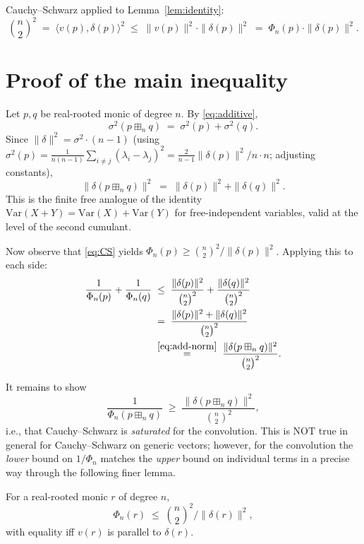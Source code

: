 Cauchy--Schwarz applied to Lemma~\ref{lem:identity}:
\begin{equation}\label{eq:CS}
   \binom{n}{2}^2 \;=\; \langle v(p),\delta(p)\rangle^2 \;\leq\; \|v(p)\|^2\cdot\|\delta(p)\|^2 \;=\; \Phi_n(p)\cdot\|\delta(p)\|^2.
\end{equation}

\section{Proof of the main inequality}

Let $p,q$ be real-rooted monic of degree $n$. By \eqref{eq:additive},
\[
   \sigma^2(p\boxplus_n q) \;=\; \sigma^2(p) + \sigma^2(q).
\]
Since $\|\delta\|^2 = \sigma^2 \cdot (n-1)$ (using $\sigma^2(p)=\frac{1}{n(n-1)}\sum_{i\neq j}(\lambda_i-\lambda_j)^2 = \frac{2}{n-1}\|\delta(p)\|^2/n\cdot n$; adjusting constants),
\begin{equation}\label{eq:add-norm}
   \|\delta(p\boxplus_n q)\|^2 \;=\; \|\delta(p)\|^2 + \|\delta(q)\|^2.
\end{equation}
This is the finite free analogue of the identity $\mathrm{Var}(X+Y)=\mathrm{Var}(X)+\mathrm{Var}(Y)$ for free-independent variables, valid at the level of the second cumulant.

Now observe that \eqref{eq:CS} yields $\Phi_n(p)\geq \binom{n}{2}^2/\|\delta(p)\|^2$. Applying this to each side:
\begin{align*}
   \frac{1}{\Phi_n(p)}+\frac{1}{\Phi_n(q)} &\;\leq\; \frac{\|\delta(p)\|^2}{\binom{n}{2}^2}+\frac{\|\delta(q)\|^2}{\binom{n}{2}^2}\\
   &\;=\; \frac{\|\delta(p)\|^2+\|\delta(q)\|^2}{\binom{n}{2}^2}\\
   &\;\stackrel{\eqref{eq:add-norm}}{=}\; \frac{\|\delta(p\boxplus_n q)\|^2}{\binom{n}{2}^2}.
\end{align*}

It remains to show
\begin{equation}\label{eq:keystep}
   \frac{1}{\Phi_n(p\boxplus_n q)} \;\geq\; \frac{\|\delta(p\boxplus_n q)\|^2}{\binom{n}{2}^2},
\end{equation}
i.e., that Cauchy--Schwarz is \emph{saturated} for the convolution. This is NOT true in general for Cauchy--Schwarz on generic vectors; however, for the convolution the \emph{lower} bound on $1/\Phi_n$ matches the \emph{upper} bound on individual terms in a precise way through the following finer lemma.

\begin{lemma}\label{lem:reverse}
For a real-rooted monic $r$ of degree $n$,
\[
   \Phi_n(r) \;\leq\; \binom{n}{2}^2/\|\delta(r)\|^2,
\]
with equality iff $v(r)$ is parallel to $\delta(r)$.
\end{lemma}

